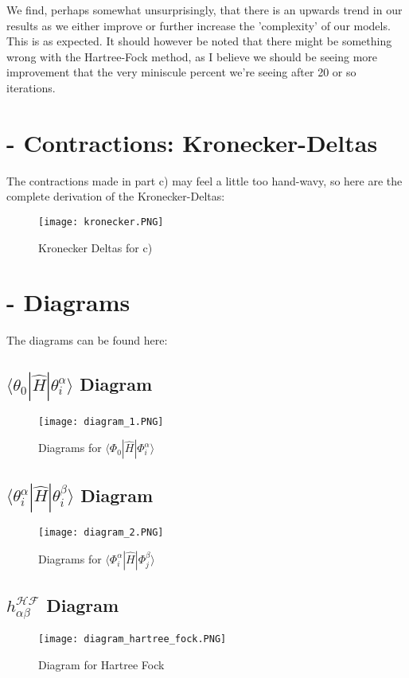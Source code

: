 \documentclass{article}
\begin{document}
\newline
We find, perhaps somewhat unsurprisingly, that there is an upwards trend in our results as we either improve or further increase the 'complexity' of our models. This is as expected. It should however be noted that there might be something wrong with the Hartree-Fock method, as I believe we should be seeing more improvement that the very miniscule percent we're seeing after 20 or so iterations. 
\renewcommand{\thesection}{Appendix \Alph{section}}
\setcounter{section}{0}
\newpage
\section{- \;Contractions: Kronecker-Deltas} \label{kron}
The contractions made in part c) may feel a little too hand-wavy, so here are the complete derivation of the Kronecker-Deltas:
\begin{figure}[ht!]
    \centering
    \texttt{[image: kronecker.PNG]}
    \caption{Kronecker Deltas for c)}
    \label{fig:enter-label}
\end{figure}
\newpage
\section{- \;Diagrams}
The diagrams can be found here:
\subsection*{$\langle \theta_0 | \hat H | \theta_i^\alpha\rangle$ Diagram}
\begin{figure}[ht!]
    \centering
    \texttt{[image: diagram\_1.PNG]}
    \caption{Diagrams for $\langle \Phi_0 | \hat H | \Phi_i^\alpha \rangle$}
    \label{fig:enter-label}
\end{figure}
\newpage
\subsection*{$\langle \theta_i^\alpha | \hat H | \theta_i^\beta\rangle$ Diagram}
\begin{figure}[ht!]
    \centering
    \texttt{[image: diagram\_2.PNG]}
    \caption{Diagrams for $\langle \Phi_i^\alpha | \hat H | \Phi_j^\beta\rangle$}
    \label{fig:enter-label}
\end{figure}
\newpage
\subsection*{$h_{\alpha\beta}^{\mathcal{H}\mathcal{F}}$ Diagram}
\begin{figure}[ht!]
    \centering
    \texttt{[image: diagram\_hartree\_fock.PNG]}
    \caption{Diagram for Hartree Fock}
    \label{fig:enter-label}
\end{figure}
\end{document}
